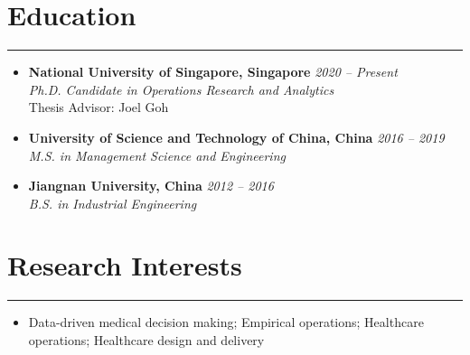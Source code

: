 \documentclass[12pt, a4paper]{article}
\begin{document}
{\small

\section*{Education}
\vspace*{0.4em}
\hrule height 0.4pt
\begin{itemize}[leftmargin=0pt, itemsep=6pt, parsep=0.2pt, topsep=1pt]

	\item[]
	\textbf{National University of Singapore, Singapore} \hfill \textit{2020 -- Present} \\
	\textit{Ph.D. Candidate in Operations Research and Analytics} \\
	Thesis Advisor: Joel Goh

	\item[]
	\textbf{University of Science and Technology of China, China} \hfill \textit{2016 -- 2019} \\
	\textit{M.S. in Management Science and Engineering}

	\item[]
	\textbf{Jiangnan University, China} \hfill \textit{2012 -- 2016} \\
	\textit{B.S. in Industrial Engineering}

\end{itemize}




\section*{Research Interests}
\vspace*{0.4em}
\hrule height 0.5pt
\begin{itemize}[leftmargin=2pt, itemsep=6pt, parsep=0.2pt, topsep=1pt]

	\item[] Data-driven medical decision making; Empirical operations; Healthcare operations;  Healthcare design and delivery
	
\end{itemize}



}
\end{document}
